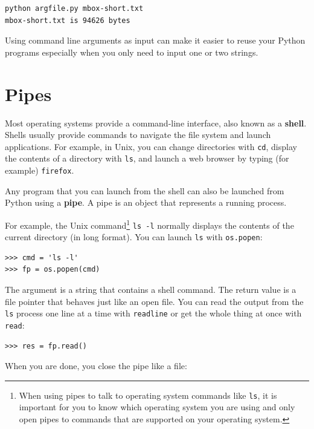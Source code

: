 \documentclass[10pt]{book}
\begin{document}
\beforeverb
\begin{verbatim}
python argfile.py mbox-short.txt
mbox-short.txt is 94626 bytes
\end{verbatim}
\afterverb
%
Using command line arguments as input can make it easier to reuse your Python programs 
especially when you only need to input one or two strings.

\section{Pipes}


Most operating systems provide a command-line interface,
also known as a {\bf shell}.  Shells usually provide commands
to navigate the file system and launch applications.  For
example, in Unix, you can change directories with {\tt cd},
display the contents of a directory with {\tt ls}, and launch
a web browser by typing (for example) {\tt firefox}.


Any program that you can launch from the shell can also be
launched from Python using a {\bf pipe}.  A pipe is an object
that represents a running process.

For example, the Unix command\footnote{When using pipes to talk 
to operating system commands like {\tt ls}, it is important 
for you to know which operating system you are using and only
open pipes to commands that are supported on your operating system.}
{\tt ls -l} normally displays the
contents of the current directory (in long format).  You can
launch {\tt ls} with {\tt os.popen}:


\beforeverb
\begin{verbatim}
>>> cmd = 'ls -l'
>>> fp = os.popen(cmd)
\end{verbatim}
\afterverb
%
The argument is a string that contains a shell command.  The
return value is a file pointer that behaves just like an open
file.  You can read the output from the {\tt ls} process one
line at a time with {\tt readline} or get the whole thing at
once with {\tt read}:


\beforeverb
\begin{verbatim}
>>> res = fp.read()
\end{verbatim}
\afterverb
%
When you are done, you close the pipe like a file:
\end{document}
